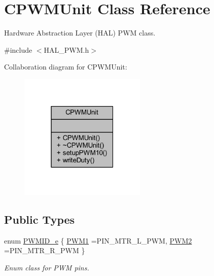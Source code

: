 \hypertarget{class_c_p_w_m_unit}{}\section{C\+P\+W\+M\+Unit Class Reference}
\label{class_c_p_w_m_unit}


Hardware Abstraction Layer (H\+AL) P\+WM class.  




{\ttfamily \#include $<$H\+A\+L\+\_\+\+P\+W\+M.\+h$>$}



Collaboration diagram for C\+P\+W\+M\+Unit\+:\nopagebreak
\begin{figure}[H]
\begin{center}
\leavevmode
\includegraphics[width=171pt]{class_c_p_w_m_unit__coll__graph}
\end{center}
\end{figure}
\subsection*{Public Types}
\begin{DoxyCompactItemize}
\item 
enum \mbox{\hyperlink{class_c_p_w_m_unit_ad3e55d1df0367d8a090d4b835704be44}{P\+W\+M\+I\+D\+\_\+e}} \{ \mbox{\hyperlink{class_c_p_w_m_unit_ad3e55d1df0367d8a090d4b835704be44a3f6167a7882e80f1ad05c8bff5e538c0}{P\+W\+M1}} =P\+I\+N\+\_\+\+M\+T\+R\+\_\+\+L\+\_\+\+P\+WM, 
\mbox{\hyperlink{class_c_p_w_m_unit_ad3e55d1df0367d8a090d4b835704be44afc7888ea63be5da5551d10db3d676185}{P\+W\+M2}} =P\+I\+N\+\_\+\+M\+T\+R\+\_\+\+R\+\_\+\+P\+WM
 \}
\begin{DoxyCompactList}\small\item\em Enum class for P\+WM pins. \end{DoxyCompactList}\end{DoxyCompactItemize}
